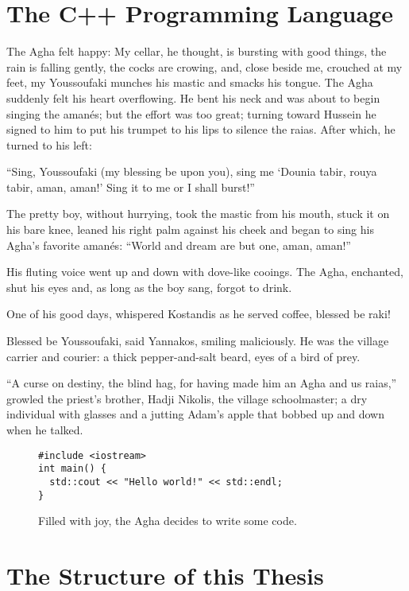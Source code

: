 \documentclass[diploma]{softlab-thesis}
\begin{document}
\section{The C++ Programming Language}

The Agha felt happy: My cellar, he thought, is bursting with good things,
the rain is falling gently, the cocks are crowing, and, close beside me,
crouched at my feet, my Youssoufaki munches his mastic and smacks his
tongue. The Agha suddenly felt his heart overflowing. He bent his neck and
was about to begin singing the amanés; but the effort was too great; turning
toward Hussein he signed to him to put his trumpet to his lips to silence
the raias. After which, he turned to his left:

``Sing, Youssoufaki (my blessing be upon you), sing me `Dounia tabir, rouya
tabir, aman, aman!' Sing it to me or I shall burst!''

The pretty boy, without hurrying, took the mastic from his mouth, stuck it
on his bare knee, leaned his right palm against his cheek and began to sing
his Agha’s favorite amanés: ``World and dream are but one, aman, aman!''

His fluting voice went up and down with dove-like cooings. The Agha,
enchanted, shut his eyes and, as long as the boy sang, forgot to drink.

One of his good days, whispered Kostandis as he served coffee, blessed be
raki!

Blessed be Youssoufaki, said Yannakos, smiling maliciously. He was the
village carrier and courier: a thick pepper-and-salt beard, eyes of a bird
of prey.

``A curse on destiny, the blind hag, for having made him an Agha and us
raias,'' growled the priest’s brother, Hadji Nikolis, the village
schoolmaster; a dry individual with glasses and a jutting Adam’s apple that
bobbed up and down when he talked.

\begin{figure}[t]
\setlength\partopsep{-\topsep}%
\begin{verbatim}
#include <iostream>
int main() {
  std::cout << "Hello world!" << std::endl;
}
\end{verbatim}
\caption{Filled with joy, the Agha decides to write some code.%
  \label{fig:hello-english}}
\end{figure}


\section{The Structure of this Thesis}
\end{document}
